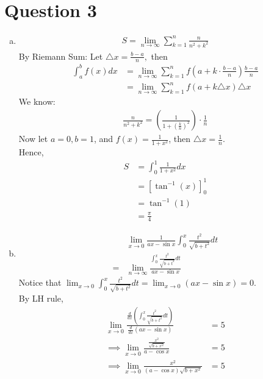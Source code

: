 \documentclass[11pt]{article}
\begin{document}
\section*{Question 3} 
\begin{enumerate}[(a)]
    \item 
    \begin{align*}
        S= \lim_{n\to \infty} \sum_{k=1}^n \frac{n}{n^2+k^2}    
    \end{align*}
    By Riemann Sum:
    Let $\triangle x = \frac{b-a}{n},$ then 
    \begin{align*}
        \int_a^b f(x) dx &= \lim_{n\to \infty}\sum_{k=1}^n f\left(a+k\cdot \frac{b-a}{n}\right)\frac{b-a}{n}\\
        &= \lim_{n\to \infty}\sum_{k=1}^n f(a+k\triangle x)\triangle x
    \end{align*}
    We know:
    \begin{align*}
        \frac{n}{n^2+k^2}=\left(\frac{1}{1+(\frac{k}{n})^2}\right)\cdot \frac{1}{n}
    \end{align*}
    Now let $a=0,b=1$, and $f(x)=\frac{1}{1+x^2}$, then $\triangle x = \frac{1}{n}.$\\
    Hence, 
    \begin{align*}
        S &= \int_0^1 \frac{1}{1+x^2}dx \\ 
        &= \left[\tan^{-1} (x)\right]_0^1\\
        &= \tan^{-1}(1)\\
        &= \frac{\pi}{4}
    \end{align*}
    \item 
    \begin{align*}
        &\lim_{x\to 0}\frac{1}{ax-\sin x}\int_0^x \frac{t^2}{\sqrt{b+t^2}}dt \\
        =& \lim_{n\to \infty} \frac{\int_0^x\frac{t^2}{\sqrt{b+t^2}}dt}{ax-\sin x}
    \end{align*}
    Notice that $\displaystyle \lim_{x\to 0}\int_0^x \frac{t^2}{\sqrt{b+t^2}}dt = \lim_{x\to 0} (ax-\sin x)=0.$\\
    By LH rule, 
    \begin{align*}
        \lim_{x\to 0} \frac{\frac{d}{dx}(\int_0^x \frac{t^2}{\sqrt{b+t^2}}dt)}{\frac{d}{dx}(ax-\sin x)}&= 5\\
        \implies \lim_{x\to 0} \frac{\frac{x^2}{\sqrt{b+x^2}}}{a-\cos x}&=5 \\ 
        \implies \lim_{x\to 0} \frac{x^2}{(a-\cos x)\sqrt{b+x^2}}&=5 
    \end{align*}

\end{enumerate}
\end{document}
